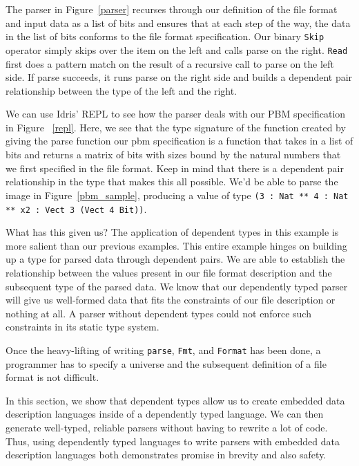 The parser in Figure~\ref{parser} recurses through our definition of the file
format and input data as a list of bits and ensures that at each step of the
way, the data in the list of bits conforms to the file format specification. Our
binary \texttt{Skip} operator simply skips over the item on the left and calls
parse on the right. \texttt{Read} first does a pattern match on the result of
a recursive call to parse on the left side. If parse succeeds, it runs parse
on the right side and builds a dependent pair relationship between the type
of the left and the right. 

We can use Idris' REPL to see how the parser deals with our PBM specification in
Figure ~\ref{repl}. Here, we see that the type signature of the function created
by giving the parse function our pbm specification is a function that takes in a
list of bits and returns a matrix of bits with sizes bound by the natural
numbers that we first specified in the file format. Keep in mind that there is a
dependent pair relationship in the type that makes this all possible. We'd be
able to parse the image in Figure~\ref{pbm_sample}, producing a value of type
\texttt{(3 : Nat ** 4 : Nat ** x2 : Vect 3 (Vect 4 Bit))}. 

What has this given us? The application of dependent types in this example is
more salient than our previous examples. This entire example hinges on building
up a type for parsed data through dependent pairs. We are able to establish the
relationship between the values present in our file format description and the
subsequent type of the parsed data. We know that our dependently typed parser
will give us well-formed data that fits the constraints of our file description
or nothing at all. A parser without dependent types could not enforce such
constraints in its static type system. 

Once the heavy-lifting of writing \texttt{parse}, \texttt{Fmt}, and
\texttt{Format} has been done, a programmer has to specify a universe and the
subsequent definition of a file format is not difficult.  

In this section, we show that dependent types allow us to create embedded data
description languages inside of a dependently typed language. We can then
generate well-typed, reliable parsers without having to rewrite a lot of code.
Thus, using dependently typed languages to write parsers with embedded data
description languages both demonstrates promise in brevity and also safety. 